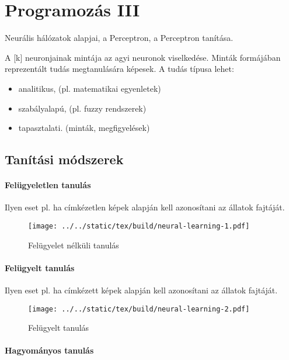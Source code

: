 \documentclass[../../main.tex]{subfiles}
\begin{document}
\section{Programozás III}

\begin{fulltheorem}
  Neurális hálózatok alapjai, a Perceptron, a Perceptron tanítása.
\end{fulltheorem}

A [k] neuronjainak mintája az agyi neuronok viselkedése.
Minták formájában reprezentált tudás megtanulására képesek. A tudás típusa
lehet:
\begin{itemize}
  \item analitikus, (pl. matematikai egyenletek)
  \item szabályalapú, (pl. fuzzy rendszerek)
  \item tapasztalati. (minták, megfigyelések)
\end{itemize}

\subsection{Tanítási módszerek}

\paragraph{Felügyeletlen tanulás}

Ilyen eset pl. ha címkézetlen képek alapján kell azonosítani az állatok fajtáját.

\begin{figure}[H]
  \centering
  \texttt{[image: ../../static/tex/build/neural-learning-1.pdf]}
  \caption{Felügyelet nélküli tanulás}
  \label{fig:learning1}
\end{figure}

\paragraph{Felügyelt tanulás}

Ilyen eset pl. ha címkézett képek alapján kell azonosítani az állatok fajtáját.

\begin{figure}[H]
  \centering
  \texttt{[image: ../../static/tex/build/neural-learning-2.pdf]}
  \caption{Felügyelt tanulás}
  \label{fig:learning2}
\end{figure}

\paragraph{Hagyományos tanulás}
\end{document}
